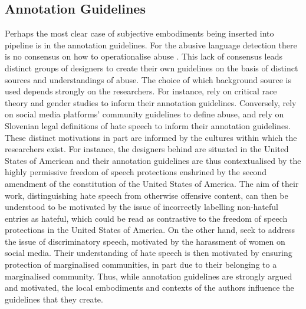 {\subsection{Annotation Guidelines}
Perhaps the most clear case of subjective embodiments being inserted into pipeline is in the annotation guidelines.
For the abusive language detection there is no consensus on how to operationalise abuse \citep{Waseem:2017}.
This lack of consensus leads distinct groups of designers to create their own guidelines on the basis of distinct sources and understandings of abuse.
The choice of which background source is used depends strongly on the researchers.
For instance, \citet{Waseem-Hovy:2016} rely on critical race theory and gender studies to inform their annotation guidelines.
Conversely, \citet{Davidson:2017} rely on social media platforms' community guidelines to define abuse, and \citet{Fiser:2017} rely on Slovenian legal definitions of hate speech to inform their annotation guidelines.
These distinct motivations in part are informed by the cultures within which the researchers exist.
For instance, the designers behind \citet{Davidson:2017} are situated in the United States of American and their annotation guidelines are thus contextualised by the highly permissive freedom of speech protections enshrined by the second amendment of the constitution of the United States of America.
The aim of their work, distinguishing hate speech from otherwise offensive content, can then be understood to be motivated by the issue of incorrectly labelling non-hateful entries as hateful, which could be read as contrastive to the freedom of speech protections in the United States of America.
On the other hand, \citet{Waseem-Hovy:2016} seek to address the issue of discriminatory speech, motivated by the harassment of women on social media.
Their understanding of hate speech is then motivated by ensuring protection of marginalised communities, in part due to their belonging to a marginalised community.
Thus, while annotation guidelines are strongly argued and motivated, the local embodiments and contexts of the authors influence the guidelines that they create.

}

